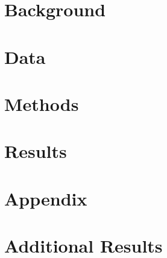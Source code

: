 \documentclass[11pt, english, letterpaper]{article}
\begin{document}
\newpage 

\newpage



\vspace{-5mm} \section*{}
\label{sec:intro}


\section{Background}
\label{sec:background}


\section{Data}
\label{sec:data}


\section{Methods}
\label{sec:methods}


\section{Results}
\label{sec:results}


% 

\newpage

\printbibliography

\setcounter{page}{0}
\setcounter{table}{0}
\setcounter{figure}{0}
\setcounter{section}{0}
\renewcommand{\thetable}{\thesection\arabic{table}}
\renewcommand{\thefigure}{\thesection\arabic{figure}}
\renewcommand{\thepage}{\thesection\arabic{page}}
\renewcommand\thesection{\Alph{section}}
\renewcommand\thesubsection{\thesection.\arabic{subsection}}
\newpage
\section*{Appendix}
\section{Additional Results}
\label{sec:addl_results}



% 
\end{document}
